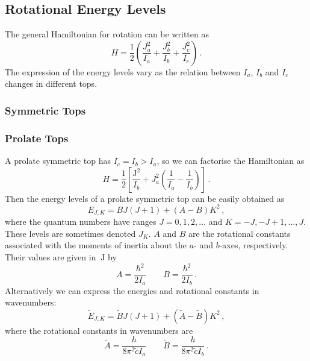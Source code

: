 \documentclass{article}
\theoremstyle{plain}\theoremheaderfont{\normalfont\itshape}\theorembodyfont{\rmfamily}\theoremseparator{.}\newtheorem*{rem}{Remark}\newtheorem*{ex}{Example}\newtheorem*{proof}{Proof}\newtheorem*{altp}{Alternative proof}
\theoremstyle{plain}\theoremheaderfont{\normalfont\bfseries}\theorembodyfont{\rmfamily}\theoremseparator{.}\newtheorem{thm}{Theorem}[section]\newtheorem{lem}[thm]{Lemma}\newtheorem{prop}[thm]{Proposition}\newtheorem*{cor}{Corollary}\newtheorem{defn}[thm]{Definition}\newtheorem{clm}[thm]{Claim}\newtheorem{clminproof}{Claim}\newtheorem{pos}{Postulate}[section]
\theoremstyle{break}\theoremheaderfont{\normalfont\itshape}\theorembodyfont{\rmfamily}\theoremseparator{.\medskip}\newtheorem*{proofskip}{Proof}\newtheorem*{exs}{Examples}\newtheorem*{rems}{Remarks}
\theoremstyle{break}\theoremheaderfont{\normalfont\bfseries}\theorembodyfont{\rmfamily}\theoremseparator{.\medskip}\newtheorem{lemskip}[thm]{Lemma}\newtheorem{defnskip}[thm]{Definition}\newtheorem{propskip}[thm]{Proposition}\newtheorem{thmskip}[thm]{Theorem}
\numberwithin{equation}{section}
\newcommand{\unit}[1]{\ \mathrm{#1}}
\newcommand{\vb}[1]{\bm{\mathrm{#1}}}
\begin{document}
    \subsection{Rotational Energy Levels}
    The general Hamiltonian for rotation can be written as
    \begin{equation}
        H=\frac{1}{2}\left(\frac{J_a^2}{I_a}+\frac{J_b^2}{I_b}+\frac{J_c^2}{I_c}\right)\,.
    \end{equation}
    The expression of the energy levels vary as the relation between \(I_a\), \(I_b\) and \(I_c\) changes in different tops.
    \subsubsection{Symmetric Tops}
    \subsubsection*{Prolate Tops}
    A prolate symmetric top has \(I_c=I_b>I_a\), so we can factorise the Hamiltonian as
    \begin{equation}
        H=\frac{1}{2}\left[\frac{\vb{J}^2}{I_b}+J_a^2\left(\frac{1}{I_a}-\frac{1}{I_b}\right)\right]\,.
    \end{equation}
    Then the energy levels of a prolate symmetric top can be easily obtained as
    \begin{equation}
        E_{J,K}=BJ(J+1)+(A-B)K^2\,,
    \end{equation}
    where the quantum numbers have ranges \(J=0,1,2,\dots\) and \(K=-J,-J+1,\dots,J\). These levels are sometimes denoted \(J_K\). \(A\) and \(B\) are the rotational constants associated with the moments of inertia about the \(a\)- and \(b\)-axes, respectively. Their values are given in \(\!\unit{J}\) by
    \begin{equation}
        A=\frac{\hbar^2}{2I_a}\qquad B=\frac{\hbar^2}{2I_b}\,.
    \end{equation}
    Alternatively we can express the energies and rotational constants in wavenumbers:
    \begin{equation}\label{prolate_top_energy}
        \tilde{E}_{J,K}=\tilde{B}J(J+1)+(\tilde{A}-\tilde{B})K^2\,,
    \end{equation}
    where the rotational constants in wavenumbers are
    \begin{equation}
        \tilde{A}=\frac{h}{8\pi^2\tilde{c}I_a}\qquad\tilde{B}=\frac{h}{8\pi^2\tilde{c}I_b}\,.
    \end{equation}
\end{document}
